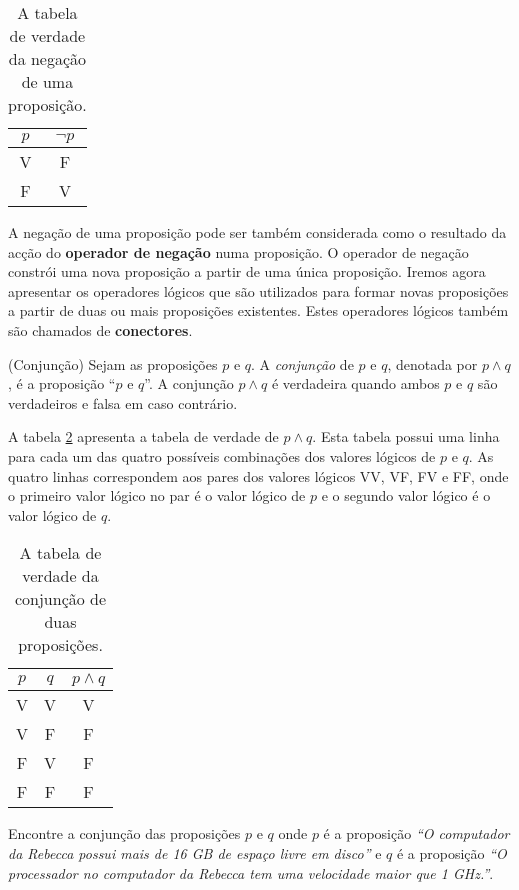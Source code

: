 \begin{table}[H]
\centering
\begin{tabular}{|c|c|}%
\toprule
\textbf{$p$} & \textbf{$\lnot p$}\\ 
\midrule
V	&	F\\
F	&	V\\
\bottomrule%
\end{tabular}%
\caption{A tabela de verdade da negação de uma proposição.}
\label{tabela:11}
\end{table}

A negação de uma proposição pode ser também considerada como o resultado da
acção do \textbf{operador de negação} numa proposição. O operador de negação
constrói uma nova proposição a partir de uma única proposição. Iremos agora
apresentar os operadores lógicos que são utilizados para formar novas
proposições a partir de duas ou mais proposições existentes. Estes operadores lógicos também
são chamados de \textbf{conectores}.

\label{def12}
\begin{defn}
(Conjunção) Sejam as proposições $p$ e $q$. A
	\emph{conjunção} de $p$ e $q$, denotada por $p \land q$, é a proposição ``$p$
	e $q$''. A conjunção $p \land q$ é verdadeira quando ambos $p$ e $q$ são
	verdadeiros e falsa em caso contrário.
\end{defn}

A tabela \ref{tabela:12} apresenta a tabela de verdade de $p \land q$. Esta
tabela possui uma linha para cada um das quatro possíveis combinações dos valores
lógicos de $p$ e $q$. As quatro linhas correspondem aos pares dos valores
lógicos VV, VF, FV e FF, onde o primeiro valor lógico no par é o valor lógico de $p$ e o
segundo valor lógico é o valor lógico de $q$.

\begin{table}[H]
\centering
\begin{tabular}{|c|c|c|}%
\toprule
\textbf{$p$} & \textbf{$q$} & \textbf{$p \land q$}\\ 
\midrule
V & V & V\\
V &	F & F\\
F &	V & F\\
F &	F & F\\
\bottomrule%
\end{tabular}%
\caption{A tabela de verdade da conjunção de duas proposições.}
\label{tabela:12}
\end{table}


\begin{exmp}
\label{exem14}
Encontre a conjunção das proposições $p$ e $q$ onde $p$ é a proposição \emph{``O
computador da Rebecca possui mais de 16 GB de espaço livre em disco''} e $q$ é a
proposição \emph{``O processador no computador da Rebecca tem uma velocidade maior que 1 GHz.''}.
\end{exmp}
	
